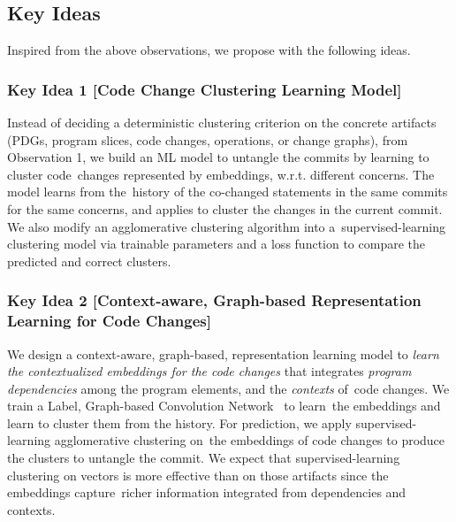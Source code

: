 \subsection{Key Ideas}
\label{ideas:sec}

Inspired from the above observations, we propose {\tool} with the
following ideas.



\subsubsection{\bf Key Idea 1 [Code Change Clustering Learning Model]}

Instead of deciding a deterministic clustering criterion on the
concrete artifacts (PDGs, program slices, code changes, operations, or
change graphs), from Observation 1, we build an ML model to untangle
the commits by learning to cluster code~changes represented by
embeddings, w.r.t. different concerns. The model learns from
the~history of the co-changed statements in the same commits for the
same concerns, and applies to cluster the changes in the current
commit.  We also modify an agglomerative clustering algorithm into
a~super\-vised-learning clustering model via trainable parameters and
a loss function to compare the predicted and correct clusters.


\subsubsection{\bf Key Idea 2 [Context-aware, Graph-based
    Representation Learning for Code Changes]}

We design a context-aware, graph-based, representation learning model
to {\em learn the contextualized embeddings for the code changes} that
integrates {\em program dependencies} among the program elements, and
the {\em contexts} of~code changes. We train a Label, Graph-based
Convolution Network~\cite{label-gcn} to learn~the embeddings and learn
to cluster them from the history.
For prediction, we apply supervised-learning agglomerative clustering
on~the embeddings of code changes to produce the clusters to untangle
the commit. We expect that supervised-learning clustering on vectors
is more effective than on those artifacts since the embeddings
capture~richer information integrated from dependencies and
contexts.

